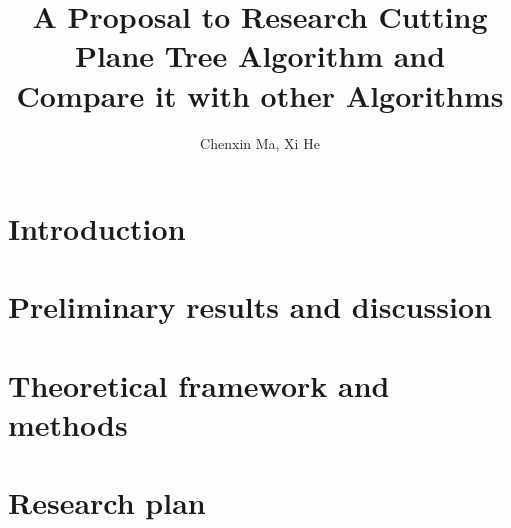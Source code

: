 \documentclass[a4paper,10pt]{article}
\title{A Proposal to Research Cutting Plane Tree Algorithm and Compare it with other Algorithms}
\author{Chenxin Ma, Xi He}
\begin{document}
\maketitle
 
\section{Introduction} 
\section{Preliminary results and discussion}
\section{Theoretical framework and methods}
  \cite{cpt11}
  \cite{cpt12}
\section{Research plan}

 

 
\end{document}
